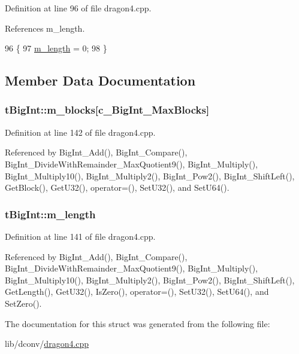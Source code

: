 Definition at line 96 of file dragon4.\+cpp.



References m\+\_\+length.


\begin{DoxyCode}
96                             \{
97         \hyperlink{structtBigInt_a86287c0800ba611962655553025b4920}{m\_length} = 0;
98     \}
\end{DoxyCode}


\subsection{Member Data Documentation}
\subsubsection[{\texorpdfstring{m\+\_\+blocks}{m_blocks}}]{ t\+Big\+Int\+::m\+\_\+blocks\mbox{[}{\bf c\+\_\+\+Big\+Int\+\_\+\+Max\+Blocks}\mbox{]}}\hypertarget{structtBigInt_a5e3b7b252d975532d51ae7ced6699351}{}\label{structtBigInt_a5e3b7b252d975532d51ae7ced6699351}


Definition at line 142 of file dragon4.\+cpp.



Referenced by Big\+Int\+\_\+\+Add(), Big\+Int\+\_\+\+Compare(), Big\+Int\+\_\+\+Divide\+With\+Remainder\+\_\+\+Max\+Quotient9(), Big\+Int\+\_\+\+Multiply(), Big\+Int\+\_\+\+Multiply10(), Big\+Int\+\_\+\+Multiply2(), Big\+Int\+\_\+\+Pow2(), Big\+Int\+\_\+\+Shift\+Left(), Get\+Block(), Get\+U32(), operator=(), Set\+U32(), and Set\+U64().

\subsubsection[{\texorpdfstring{m\+\_\+length}{m_length}}]{ t\+Big\+Int\+::m\+\_\+length}\hypertarget{structtBigInt_a86287c0800ba611962655553025b4920}{}\label{structtBigInt_a86287c0800ba611962655553025b4920}


Definition at line 141 of file dragon4.\+cpp.



Referenced by Big\+Int\+\_\+\+Add(), Big\+Int\+\_\+\+Compare(), Big\+Int\+\_\+\+Divide\+With\+Remainder\+\_\+\+Max\+Quotient9(), Big\+Int\+\_\+\+Multiply(), Big\+Int\+\_\+\+Multiply10(), Big\+Int\+\_\+\+Multiply2(), Big\+Int\+\_\+\+Pow2(), Big\+Int\+\_\+\+Shift\+Left(), Get\+Length(), Get\+U32(), Is\+Zero(), operator=(), Set\+U32(), Set\+U64(), and Set\+Zero().



The documentation for this struct was generated from the following file\+:\begin{DoxyCompactItemize}
\item 
lib/dconv/\hyperlink{dragon4_8cpp}{dragon4.\+cpp}\end{DoxyCompactItemize}
